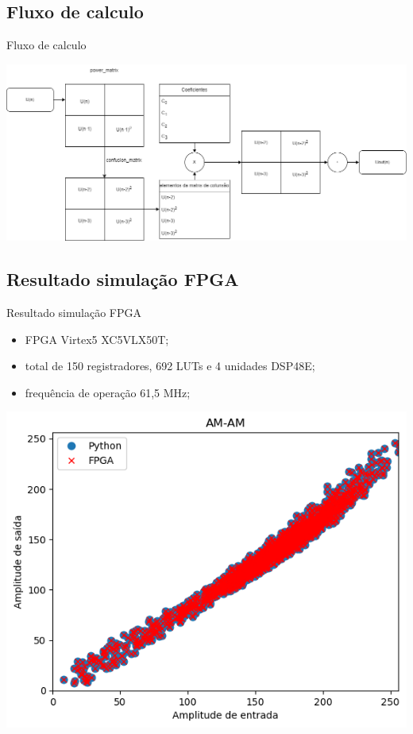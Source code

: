 \documentclass{if-beamer}
\begin{document}
\subsection{Fluxo de calculo}
\begin{frame}{Fluxo de calculo}
	
	\includegraphics[scale=0.25]{fluxo_de_calculo.png}
\end{frame}
\subsection{Resultado simulação FPGA}
\begin{frame}{Resultado simulação FPGA}
	\begin{minipage}{0.5\textwidth}
	\begin{itemize}
		\item FPGA Virtex5 XC5VLX50T;
		\item total de 150 registradores, 692 LUTs e 4 unidades DSP48E;
		\item frequência de operação 61,5 MHz;
	\end{itemize}
	
	
\end{minipage}%
\hspace{0.04\textwidth}
\begin{minipage}{0.5\textwidth}
	\includegraphics[scale=0.40]{fpgasim.png}
\end{minipage}
\end{frame}
\end{document}
